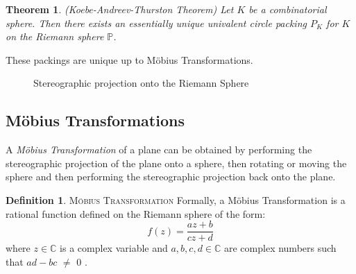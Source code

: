 \documentclass[11pt]{article}
\newcommand{\C}{\mathbb{C}}
\newtheorem{theorem}{Theorem}[section]
\theoremstyle{definition}
\newtheorem{definition}{Definition}[section]
\begin{document}
	\begin{theorem}{(Koebe-Andreev-Thurston Theorem)}
		Let $K$ be a combinatorial sphere. 
		Then there exists an essentially unique univalent circle packing $P_K$ for $K$ on the Riemann sphere $\mathbb{P}$.
	\end{theorem}
	
	These packings are unique up to M\"{o}bius Transformations.

	\begin{figure}[h]%
    		\centering
    		\qquad
    		\caption{Stereographic projection onto the Riemann Sphere}%
    		\label{fig:riemann}%
	\end{figure}

\subsection{M\"{o}bius Transformations}
	
	A \emph{M\"{o}bius Transformation} of a plane can be obtained by performing the stereographic projection of the plane onto a sphere, then rotating or moving the sphere and then performing the stereographic projection back onto the plane. 
	
 	\theoremstyle{definition}
	\begin{definition}{\textsc{M\"{o}bius Transformation}}
		Formally, a M\"{o}bius Transformation is a rational function defined on the Riemann sphere of the form:
  		\begin{equation} 
  			f(z) = \frac{az+b}{cz+d}
  		\end{equation}
  	where $z\in\C$ is a complex variable and $a,b,c,d\in\C$ are complex numbers such that $ad - bc$ $\neq$ $0$ \cite{stephenson05introduction}. 
	\end{definition}
	
\end{document}
